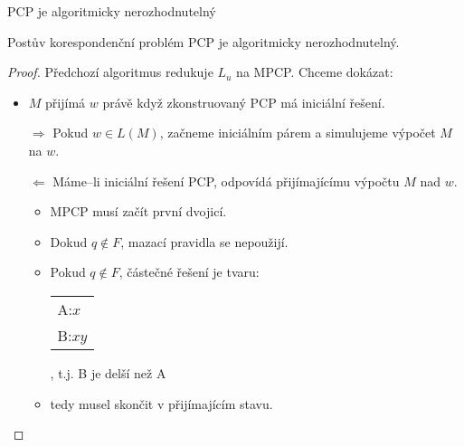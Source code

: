     
    \begin{frame}{PCP je algoritmicky nerozhodnutelný}
    \begin{theorem}
    Postův korespondenční problém PCP je algoritmicky nerozhodnutelný.
    \end{theorem}
    \pause
    \begin{proof}
    Předchozí algoritmus redukuje $L_u$ na MPCP. Chceme dokázat:
    \begin{itemize}
        \item $M$ přijímá $w$ právě když zkonstruovaný PCP má iniciální řešení.
    \end{itemize}
    \pause
    \begin{itemize}
        \item[$\Rightarrow$] Pokud $w\in L(M)$, začneme iniciálním párem a simulujeme výpočet  $M$ na $w$.  
    \pause
        \item[$\Leftarrow $] Máme--li iniciální řešení PCP, odpovídá přijímajícímu výpočtu $M$ nad $w$.
            \begin{itemize}
            \item MPCP musí začít první dvojicí.
            \item Dokud $q\notin F$, mazací pravidla se nepoužijí.
            \item Pokud $q\notin F$, částečné řešení je tvaru:
    \begin{tabular}{l}A:$x$\\B:$xy$\end{tabular}, t.j. B je delší než A
    \item tedy musel skončit v přijímajícím stavu.
            
        \end{itemize}
    \end{itemize}
    \end{proof}
    \end{frame}
    
